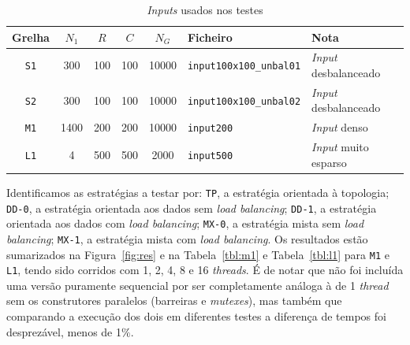 \documentclass[10pt,a4paper,oneside]{article}
\begin{document}
\begin{table}[H]
  \small
  \caption{\textit{Inputs} usados nos testes}
  \label{tab:inps}
  \centering
  \begin{tabular}{|c|c|c|c|c|l|l|}
    \hline
    Grelha   & $N_1$ & $R$ & $C$ & $N_G$  & Ficheiro                    & Nota \\ \hline \hline
    {\tt S1} & 300   & 100 & 100 & 10000 & {\tt input100x100\_unbal01} & \textit{Input} desbalanceado \\ \hline
    {\tt S2} & 300   & 100 & 100 & 10000 & {\tt input100x100\_unbal02} & \textit{Input} desbalanceado \\ \hline
    {\tt M1} & 1400  & 200 & 200 & 10000 & {\tt input200}              & \textit{Input} denso \\ \hline
    {\tt L1} & 4     & 500 & 500 & 2000  & {\tt input500}              & \textit{Input} muito esparso \\ \hline
  \end{tabular}
\end{table}

Identificamos as estratégias a testar por: {\tt TP}, a estratégia
orientada à topologia; {\tt DD-0}, a estratégia orientada aos dados
sem \textit{load balancing}; {\tt DD-1}, a estratégia orientada aos
dados com \textit{load balancing}; {\tt MX-0}, a estratégia mista sem
\textit{load balancing}; {\tt MX-1}, a estratégia mista com
\textit{load balancing}. Os resultados estão sumarizados na
Figura~\ref{fig:res} e na Tabela~\ref{tbl:m1} e Tabela~\ref{tbl:l1}
para {\tt M1} e {\tt L1}, tendo sido corridos com 1, 2, 4, 8 e 16 {\it
  threads}. É de notar que não foi incluída uma versão puramente
sequencial por ser completamente análoga à de 1 {\it thread} sem os
construtores paralelos (barreiras e {\it mutexes}), mas também que
comparando a execução dos dois em diferentes testes a diferença de
tempos foi desprezável, menos de 1$\%$.
\end{document}
